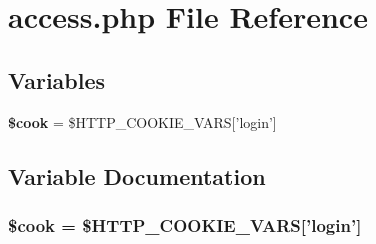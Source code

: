 \section{access.php File Reference}
\label{access_8php}


\subsection*{Variables}
\begin{CompactItemize}
\item 
{\bf \$cook} = \$HTTP\_\-COOKIE\_\-VARS['login']
\end{CompactItemize}


\subsection{Variable Documentation}
\subsubsection{\setlength{\rightskip}{0pt plus 5cm}\$cook = \$HTTP\_\-COOKIE\_\-VARS['login']}\label{access_8php_ba7ee1ce52bafb9b3af8d03db6496ec9}


